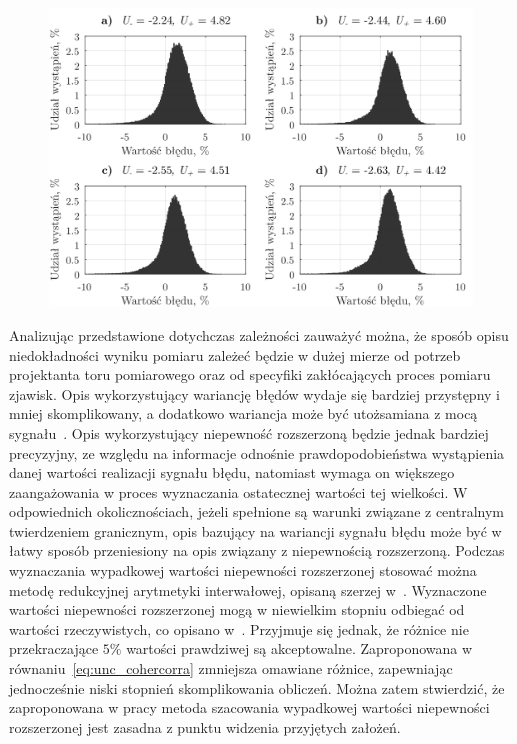\begin{figure}[htb!]
\begin{center}
\includegraphics{obrazki/hist_reductive}
\end{center}
\end{figure}

Analizując przedstawione dotychczas zależności zauważyć można, że sposób opisu niedokładności wyniku pomiaru zależeć będzie w dużej mierze od potrzeb projektanta toru pomiarowego oraz od specyfiki zakłócających proces pomiaru zjawisk. Opis wykorzystujący wariancję błędów wydaje się bardziej przystępny i mniej skomplikowany, a dodatkowo wariancja może być utożsamiana z mocą sygnału~\cite{proakis_dsp}. Opis wykorzystujący niepewność rozszerzoną będzie jednak bardziej precyzyjny, ze względu na informacje odnośnie prawdopodobieństwa wystąpienia danej wartości realizacji sygnału błędu, natomiast wymaga on większego zaangażowania w proces wyznaczania ostatecznej wartości tej wielkości. W odpowiednich okolicznościach, jeżeli spełnione są warunki związane z centralnym twierdzeniem granicznym, opis bazujący na wariancji sygnału błędu może być w łatwy sposób przeniesiony na opis związany z niepewnością rozszerzoną. Podczas wyznaczania wypadkowej wartości niepewności rozszerzonej stosować można metodę redukcyjnej arytmetyki interwałowej, opisaną szerzej w~\cite{jakubiec_reductive, jakubiec_redmono, batko_uncertainty}. Wyznaczone wartości niepewności rozszerzonej mogą w niewielkim stopniu odbiegać od wartości rzeczywistych, co opisano w~\cite{jakubiec_arithmetic, jakubiec_model}. Przyjmuje się jednak, że różnice nie przekraczające $5\%$ wartości prawdziwej są akceptowalne. Zaproponowana w równaniu~\eqref{eq:unc_cohercorra} zmniejsza omawiane różnice, zapewniając jednocześnie niski stopnień skomplikowania obliczeń. Można zatem stwierdzić, że zaproponowana w pracy metoda szacowania wypadkowej wartości niepewności rozszerzonej jest zasadna z punktu widzenia przyjętych założeń.

